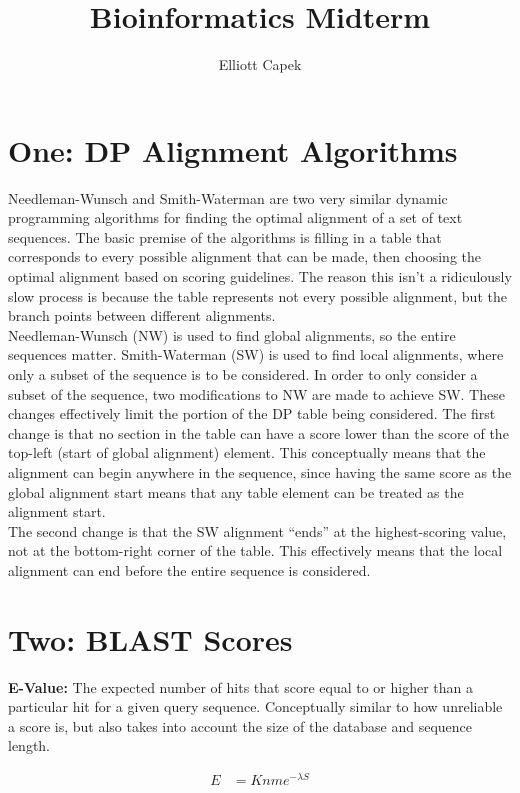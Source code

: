 \documentclass[10pt]{article} %
\title{Bioinformatics Midterm}
\author{Elliott Capek}
\begin{document}
\maketitle{}
\section{One: DP Alignment Algorithms}
Needleman-Wunsch and Smith-Waterman are two very similar dynamic programming
algorithms for finding the optimal alignment of a set of text sequences. The
basic premise of the algorithms is filling in a table that corresponds to every
possible alignment that can be made, then choosing the optimal alignment based
on scoring guidelines. The reason this isn't a ridiculously slow process is
because the table represents not every possible alignment, but the branch points
between different alignments.\\

Needleman-Wunsch (NW) is used to find global alignments, so the entire sequences
matter. Smith-Waterman (SW) is used to find local alignments, where only a subset of
the sequence is to be considered. In order to only consider a subset of the sequence,
two modifications to NW are made to achieve SW. These changes effectively limit
the portion of the DP table being considered. The first change is that no section in
the table can have a score lower than the score of the top-left (start of global
alignment) element. This conceptually means that the alignment can begin anywhere
in the sequence, since having the same score as the global alignment start means
that any table element can be treated as the alignment start.\\

The second change is that the SW alignment ``ends'' at the highest-scoring value,
not at the bottom-right corner of the table. This effectively means that the local
alignment can end before the entire sequence is considered.\\

\section{Two: BLAST Scores}
\textbf{E-Value:} The expected number of hits that score equal to or higher than a
particular hit for a given query sequence. Conceptually similar to how unreliable a
score is, but also takes into account the size of the database and sequence length.

\begin{align*}
  E &= Knme^{-\lambda S}\\
\end{align*}
\end{document}
